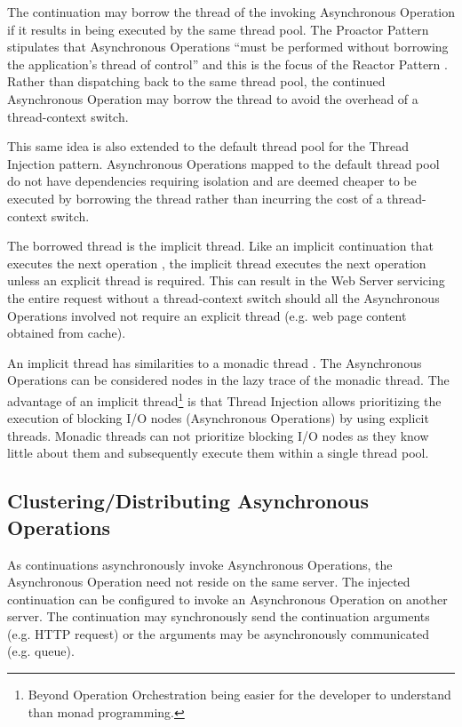 \documentclass[prodmode]{style/acmlarge}
\begin{document}
The continuation may borrow the thread of the invoking Asynchronous Operation if
it results in being executed by the same thread pool.  The Proactor Pattern
stipulates that Asynchronous Operations ``must be performed without borrowing
the application's thread of control'' \cite[p. 8]{proactor} and this is the
focus of the Reactor Pattern \cite{reactor}.  Rather than dispatching back to
the same thread pool, the continued Asynchronous Operation may borrow the thread
to avoid the overhead of a thread-context switch.

This same idea is also extended to the default thread pool for the Thread
Injection pattern.  Asynchronous Operations mapped to the default thread pool do
not have dependencies requiring isolation and are deemed cheaper to be executed
by borrowing the thread rather than incurring the cost of a thread-context
switch.

The borrowed thread is the implicit thread.  Like an implicit continuation that
executes the next operation \cite{continuations}, the implicit thread executes
the next operation unless an explicit thread is required.  This can result in
the Web Server servicing the entire request without a thread-context switch
should all the Asynchronous Operations involved not require an explicit thread
(e.g. web page content obtained from cache).

An implicit thread has similarities to a monadic thread \cite{monadic-thread}.
The Asynchronous Operations can be considered nodes in the lazy trace of the
monadic thread.  The advantage of an implicit thread\footnote{Beyond Operation
Orchestration being easier for the developer to understand than monad
programming.} is that Thread Injection allows prioritizing the execution of
blocking I/O nodes (Asynchronous Operations) by using explicit threads.  Monadic
threads can not prioritize blocking I/O nodes as they know little about them and
subsequently execute them within a single thread pool.


\subsection{Clustering/Distributing Asynchronous Operations}

As continuations asynchronously invoke Asynchronous Operations, the Asynchronous
Operation need not reside on the same server.  The injected continuation can be
configured to invoke an Asynchronous Operation on another server.  The
continuation may synchronously send the continuation arguments (e.g. HTTP
request) or the arguments may be asynchronously communicated (e.g.
queue).
\end{document}
